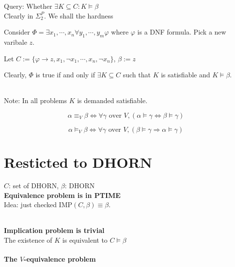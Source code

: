 \documentclass[12pt]{article}
\begin{document}
{Query: Whether $\exists K\subseteq C: K\models \beta$\\ 

Clearly in $\Sigma_2^P$. We shall the hardness

Consider $\Phi=\exists x_1,\cdots, x_n\forall y_1,\cdots,y_m \varphi$ where $\varphi$ is a DNF formula. Pick a new varibale $z$.

Let $C:=\{\varphi\rightarrow z, x_1,\neg x_1,\cdots, x_n,\neg x_n\}$, $\beta:=z$

Clearly, $\Phi$ is true if and only if $\exists K\subseteq C$ such that $K$ is satisfiable and $K\models \beta$.


\ \\ 

Note: In all problems $K$ is demanded satisfiable.

$$\alpha \equiv_V \beta \Longleftrightarrow \forall \gamma \mbox{ over } V, (\alpha\models \gamma \Leftrightarrow \beta\models \gamma) $$

$$\alpha \models_V \beta \Longleftrightarrow \forall \gamma \mbox{ over } V, (\beta\models \gamma \Longrightarrow \alpha\models \gamma) $$










\section{Resticted to DHORN}

$C$: set of DHORN, $\beta$: DHORN \\

{\bf Equivalence problem is in PTIME} \\

Idea: just checked IMP$(C,\beta)\equiv \beta$. 




\ \\

{\bf Implication problem is trivial} \\ 

The existence of $K$ is equivalent to $C\models\beta$\\

\ \\


{\bf The $V$-equivalence problem}\\

}
\end{document}
